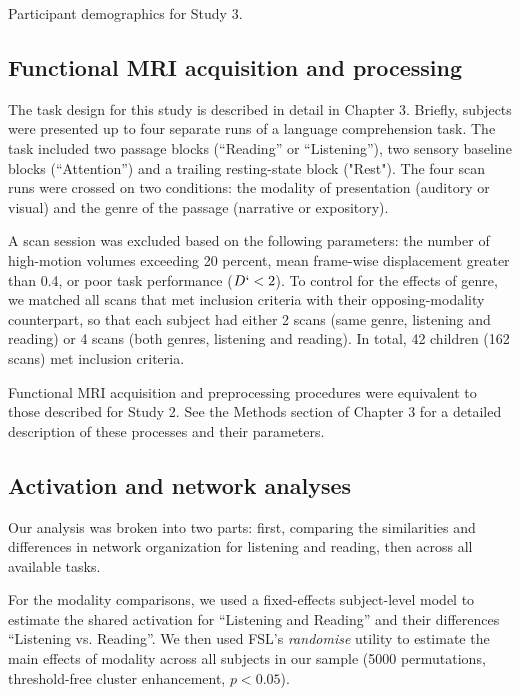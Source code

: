 \begin{table}[t]
	\renewcommand{\tabcolsep}{0.09cm}
	\centering
	
	\caption[Participant demographics for Study 3.]{Participant demographics for Study 3.}
	\label{table:ch4-participants}
\end{table}

\subsection{Functional MRI acquisition and processing}

The task design for this study is described in detail in Chapter 3. Briefly, subjects were presented up to four separate runs of a language comprehension task. The task included two passage blocks (``Reading'' or ``Listening''), two sensory baseline blocks (``Attention'') and a trailing resting-state block ("Rest"). The four scan runs were crossed on two conditions: the modality of presentation (auditory or visual) and the genre of the passage (narrative or expository). 

A scan session was excluded based on the following parameters: the number of high-motion volumes exceeding 20 percent, mean frame-wise displacement greater than 0.4, or poor task performance ($D` < 2$). To control for the effects of genre, we matched all scans that met inclusion criteria with their opposing-modality counterpart, so that each subject had either 2 scans (same genre, listening and reading) or 4 scans (both genres, listening and reading). In total, 42 children (162 scans) met inclusion criteria.

Functional MRI acquisition and preprocessing procedures were equivalent to those described for Study 2. See the Methods section of Chapter 3 for a detailed description of these processes and their parameters.

\subsection{Activation and network analyses}

Our analysis was broken into two parts: first, comparing the similarities and differences in network organization for listening and reading, then across all available tasks. 

For the modality comparisons, we used a fixed-effects subject-level model to estimate the shared activation for ``Listening and Reading'' and their differences ``Listening vs. Reading''. We then used FSL's \textit{randomise} utility to estimate the main effects of modality across all subjects in our sample (5000 permutations, threshold-free cluster enhancement, $p < 0.05$).

